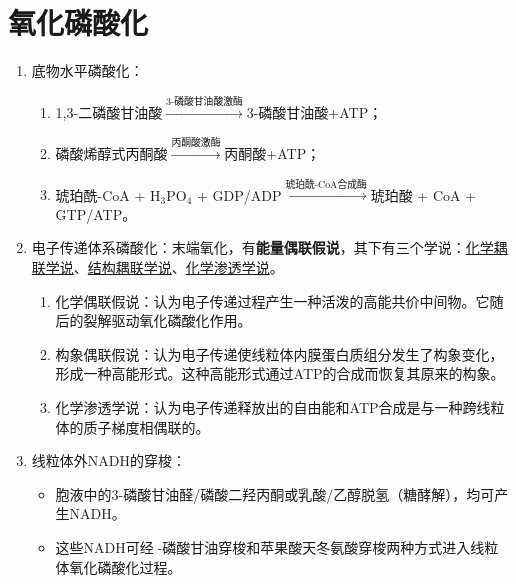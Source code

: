 \section{氧化磷酸化}
\begin{enumerate}
    \item 底物水平磷酸化：
    \begin{enumerate}
        \item 1,3-二磷酸甘油酸$\overset{\text{3-磷酸甘油酸激酶}}\longrightarrow$3-磷酸甘油酸+ATP；
        \item 磷酸烯醇式丙酮酸$\overset{\text{丙酮酸激酶}}\longrightarrow$丙酮酸+ATP；
        \item 琥珀酰-CoA + H$_3$PO$_4$ + GDP/ADP$\overset{\text{琥珀酰-CoA合成酶}}\longrightarrow$琥珀酸 + CoA + GTP/ATP。
    \end{enumerate}
    \item 电子传递体系磷酸化：末端氧化，有\textbf{能量偶联假说}，其下有三个学说：\uline{化学耦联学说}、\uline{结构耦联学说}、\uline{化学渗透学说}。
    \begin{enumerate}
        \item 化学偶联假说：认为电子传递过程产生一种活泼的高能共价中间物。它随后的裂解驱动氧化磷酸化作用。
        \item 构象偶联假说：认为电子传递使线粒体内膜蛋白质组分发生了构象变化，形成一种高能形式。这种高能形式通过ATP的合成而恢复其原来的构象。
        \item 化学渗透学说：认为电子传递释放出的自由能和ATP合成是与一种跨线粒体的质子梯度相偶联的。
    \end{enumerate}
    \item 线粒体外NADH的穿梭：
    \begin{itemize}
        \item 胞液中的3-磷酸甘油醛/磷酸二羟丙酮或乳酸/乙醇脱氢（糖酵解），均可产生NADH。
        \item 这些NADH可经-磷酸甘油穿梭和苹果酸天冬氨酸穿梭两种方式进入线粒体氧化磷酸化过程。
    \end{itemize}
\end{enumerate}

